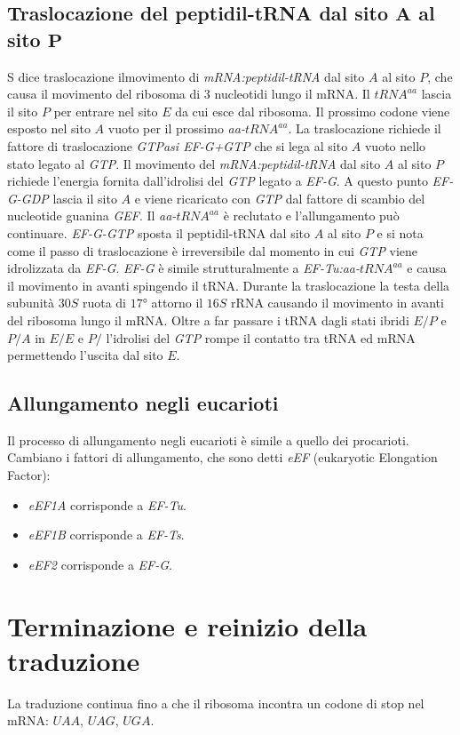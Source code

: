 \subsection{Traslocazione del peptidil-tRNA dal sito $\mathbf{A}$ al sito $\mathbf{P}$}
S dice traslocazione ilmovimento di \emph{mRNA:peptidil-tRNA} dal sito $A$ al sito $P$, che causa il movimento del ribosoma di $3$ nucleotidi lungo il mRNA. Il \emph{$tRNA^{aa}$}
lascia il sito $P$ per entrare nel sito $E$ da cui esce dal ribosoma. Il prossimo codone viene esposto nel sito $A$ vuoto per il prossimo \emph{aa-$tRNA^{aa}$}. La traslocazione
richiede il fattore di traslocazione \emph{GTPasi EF-G+GTP} che si lega al sito $A$ vuoto nello stato legato al \emph{GTP}. Il movimento del \emph{mRNA:peptidil-tRNA} dal sito $A$
al sito $P$ richiede l'energia fornita dall'idrolisi del \emph{GTP} legato a \emph{EF-G}. A questo punto \emph{EF-G-GDP} lascia il sito $A$ e viene ricaricato con \emph{GTP}
dal fattore di scambio del nucleotide guanina \emph{GEF}. Il \emph{aa-$tRNA^{aa}$} \`e reclutato e l'allungamento pu\`o continuare. \emph{EF-G-GTP} sposta il peptidil-tRNA dal
sito $A$ al sito $P$ e si nota come il passo di traslocazione \`e irreversibile dal momento in cui \emph{GTP} viene idrolizzata da \emph{EF-G}. \emph{EF-G} \`e simile strutturalmente
a \emph{EF-Tu:aa-$tRNA^{aa}$} e causa il movimento in avanti spingendo il tRNA. Durante la traslocazione la testa della subunit\`a $30S$ ruota di $17\si{\degree}$ attorno il 
$16S$ rRNA causando il movimento in avanti del ribosoma lungo il mRNA. Oltre a far passare i tRNA dagli stati ibridi $E/P$ e $P/A$ in $E/E$ e $P/$ l'idrolisi del \emph{GTP}
rompe il contatto tra tRNA ed mRNA permettendo l'uscita dal sito $E$. 
\subsection{Allungamento negli eucarioti}
Il processo di allungamento negli eucarioti \`e simile a quello dei procarioti. Cambiano i fattori di allungamento, che sono detti \emph{eEF} (eukaryotic Elongation Factor):
\begin{itemize}
	\item \emph{eEF1A} corrisponde a \emph{EF-Tu}.
	\item \emph{eEF1B} corrisponde a \emph{EF-Ts}.
	\item \emph{eEF2} corrisponde a \emph{EF-G}.
\end{itemize}
\section{Terminazione e reinizio della traduzione}
La traduzione continua fino a che il ribosoma incontra un codone di stop nel mRNA: $UAA$, $UAG$, $UGA$. 
